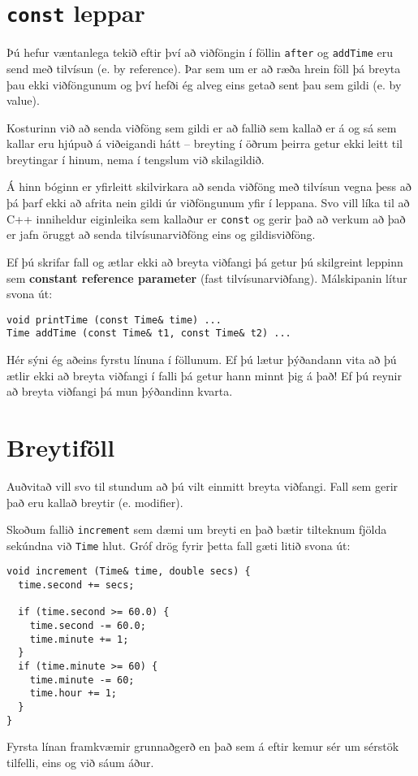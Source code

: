 \section{{\tt const} leppar}

Þú hefur væntanlega tekið eftir því að viðföngin í föllin {\tt after}
og {\tt addTime} eru send með tilvísun (e. by reference).
Þar sem um er að ræða hrein föll þá breyta þau ekki viðföngunum og því hefði ég alveg eins getað sent þau sem gildi (e. by value).

Kosturinn við að senda viðföng sem gildi er að fallið sem kallað er á og sá sem kallar eru hjúpuð á viðeigandi hátt -- breyting í öðrum þeirra getur ekki leitt til breytingar í hinum, nema í tengslum við skilagildið.

Á hinn bóginn er yfirleitt skilvirkara að senda viðföng með tilvísun vegna þess að þá þarf ekki að afrita nein gildi úr viðföngunum yfir í leppana.
Svo vill líka til að C++ inniheldur eiginleika sem kallaður er {\tt const} og gerir það að verkum að það er jafn öruggt að senda tilvísunarviðföng eins og gildisviðföng.

Ef þú skrifar fall og ætlar ekki að breyta viðfangi þá getur þú skilgreint leppinn sem {\bf constant reference parameter} (fast tilvísunarviðfang).
Málskipanin lítur svona út:

\begin{verbatim}
void printTime (const Time& time) ...
Time addTime (const Time& t1, const Time& t2) ...
\end{verbatim}
%
Hér sýni ég aðeins fyrstu línuna í föllunum.
Ef þú lætur þýðandann vita að þú ætlir ekki að breyta viðfangi í falli þá getur hann minnt þig á það!
Ef þú reynir að breyta viðfangi þá mun þýðandinn kvarta.


\section{Breytiföll}

Auðvitað vill svo til stundum að þú vilt einmitt breyta viðfangi.  Fall sem gerir það eru kallað breytir (e. modifier).

Skoðum fallið {\tt increment} sem dæmi um breyti en það bætir tilteknum fjölda sekúndna við {\tt Time} hlut.
Gróf drög fyrir þetta fall gæti litið svona út:

\begin{verbatim}
void increment (Time& time, double secs) {
  time.second += secs;

  if (time.second >= 60.0) {
    time.second -= 60.0;
    time.minute += 1;
  }
  if (time.minute >= 60) {
    time.minute -= 60;
    time.hour += 1;
  }
}
\end{verbatim}
%
Fyrsta línan framkvæmir grunnaðgerð en það sem á eftir kemur sér um sérstök tilfelli, eins og við sáum áður.

